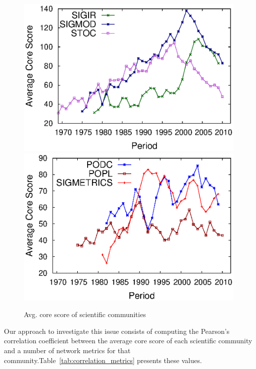 \begin{figure}[!htb]
  \begin{center}
    \includegraphics[scale=.325]{graficos/average_core_score/average_core_score_slide_window_grupo_1_temporal_web.eps}
    \includegraphics[scale=.325]{graficos/average_core_score/average_core_score_slide_window_grupo_2_temporal_web.eps}
  \end{center}
  \vspace{-0.5cm}
  \caption{Avg. core score of scientific communities}
  \vspace{-0.2cm}
  \label{fig:average_core_score}
\end{figure}


Our approach to investigate this issue consists of computing the Pearson's correlation coefficient between the average core score of each scientific community and a number of
network metrics for that community.Table~\ref{tab:correlation_metrics} presents these values.

